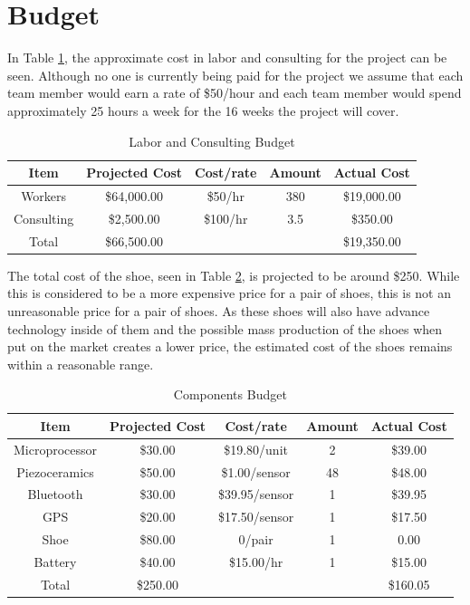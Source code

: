 \documentclass[letterpaper, 12 pt, onecolumn, hidelinks]{ieeetran}
\begin{document}
\section{Budget}\label{sec:Budget}
In Table \ref{table:Labor}, the approximate cost in labor and consulting for the project can be seen. Although no one is currently being paid for the project we assume that each team member would earn a rate of \$50/hour and each team member would spend approximately 25 hours a week for the 16 weeks the project will cover.

\begin{table}[h!]
	\caption{\label{table:Labor}Labor and Consulting Budget}
	\begin{center}
		\begin{tabular}{ |c|c|c|c|c| } 
			\hline
			Item & Projected Cost & Cost/rate & Amount & Actual Cost \\
			\hline
			Workers & \$64,000.00 & \$50/hr & 380 & \$19,000.00 \\ 
			Consulting & \$2,500.00 & \$100/hr & 3.5 & \$350.00 \\ 
			\hline
			Total & \$66,500.00 &  &  & \$19,350.00 \\
			\hline
		\end{tabular}
	\end{center}
\end{table}

The total cost of the shoe, seen in Table \ref{table:Components}, is projected to be around \$250. While this is considered to be a more expensive price for a pair of shoes, this is not an unreasonable price for a pair of shoes. As these shoes will also have advance technology inside of them and the possible mass production of the shoes when put on the market creates a lower price, the estimated cost of the shoes remains within a reasonable range.

\begin{table}[h!]
	\caption{\label{table:Components}Components Budget}
	\begin{center}
		\begin{tabular}{ |c|c|c|c|c| } 
			\hline
			Item & Projected Cost & Cost/rate & Amount & Actual Cost \\
			\hline
			Microprocessor & \$30.00 & \$19.80/unit & 2 & \$39.00 \\ 
			Piezoceramics & \$50.00 & \$1.00/sensor & 48 & \$48.00 \\ 
			Bluetooth & \$30.00 & \$39.95/sensor & 1 & \$39.95 \\ 
			GPS & \$20.00 & \$17.50/sensor & 1 & \$17.50 \\ 
			Shoe & \$80.00 & 0/pair & 1 & 0.00 \\ 
			Battery & \$40.00 & \$15.00/hr & 1 & \$15.00 \\ 
			\hline
			Total & \$250.00 &  &  & \$160.05 \\ 
			\hline
		\end{tabular}
	\end{center} 
\end{table}
\end{document}
